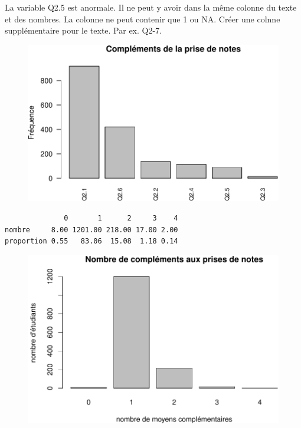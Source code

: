 \documentclass[]{article}
\begin{document}
La variable Q2.5 est anormale. Il ne peut y avoir dans la même colonne
du texte et des nombres. La colonne ne peut contenir que 1 ou NA. Créer
une colnne supplémentaire pour le texte. Par ex. Q2-7.

\begin{figure}[htbp]
\centering
\includegraphics{qs_etudiants_files/figure-latex/unnamed-chunk-3-1.pdf}
\end{figure}

\begin{verbatim}
              0       1      2     3    4
nombre     8.00 1201.00 218.00 17.00 2.00
proportion 0.55   83.06  15.08  1.18 0.14
\end{verbatim}

\begin{figure}[htbp]
\centering
\includegraphics{qs_etudiants_files/figure-latex/unnamed-chunk-3-2.pdf}
\end{figure}
\end{document}
